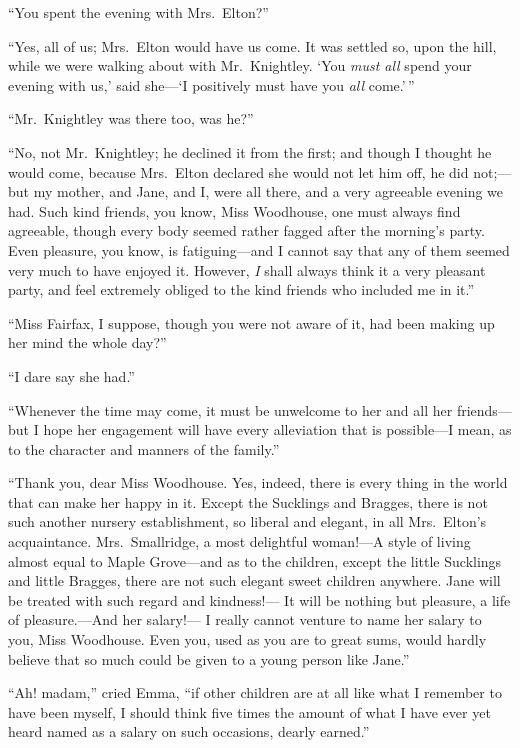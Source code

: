 ``You spent the evening with Mrs.\ Elton?''

``Yes, all of us; Mrs.\ Elton would have us come.  It was settled so,
upon the hill, while we were walking about with Mr.\ Knightley.
`You \emph{must all} spend your evening with us,' said she---`I positively must
have you \emph{all} come.'\,''

``Mr.\ Knightley was there too, was he?''

``No, not Mr.\ Knightley; he declined it from the first; and though I
thought he would come, because Mrs.\ Elton declared she would not let
him off, he did not;---but my mother, and Jane, and I, were all there,
and a very agreeable evening we had.  Such kind friends, you know,
Miss Woodhouse, one must always find agreeable, though every body
seemed rather fagged after the morning's party.  Even pleasure,
you know, is fatiguing---and I cannot say that any of them seemed
very much to have enjoyed it.  However, \emph{I} shall always think it
a very pleasant party, and feel extremely obliged to the kind friends
who included me in it.''

``Miss Fairfax, I suppose, though you were not aware of it, had been
making up her mind the whole day?''

``I dare say she had.''

``Whenever the time may come, it must be unwelcome to her and all
her friends---but I hope her engagement will have every alleviation
that is possible---I mean, as to the character and manners of the family.''

``Thank you, dear Miss Woodhouse.  Yes, indeed, there is every thing
in the world that can make her happy in it.  Except the Sucklings
and Bragges, there is not such another nursery establishment,
so liberal and elegant, in all Mrs.\ Elton's acquaintance.
Mrs.\ Smallridge, a most delightful woman!---A style of living almost
equal to Maple Grove---and as to the children, except the little
Sucklings and little Bragges, there are not such elegant sweet
children anywhere.  Jane will be treated with such regard and kindness!---%
It will be nothing but pleasure, a life of pleasure.---And her salary!---%
I really cannot venture to name her salary to you, Miss Woodhouse.
Even you, used as you are to great sums, would hardly believe that
so much could be given to a young person like Jane.''

``Ah! madam,'' cried Emma, ``if other children are at all like what I
remember to have been myself, I should think five times the amount
of what I have ever yet heard named as a salary on such occasions,
dearly earned.''


